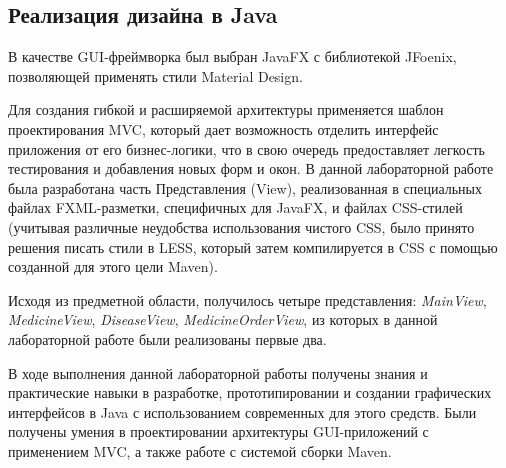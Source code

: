 \documentclass[a4paper,14pt]{extarticle}
\newcommand{\Code}[1]{\textit{#1}}
\begin{document}


\clearpage

\subsection{Реализация дизайна в Java}

В качестве GUI-фреймворка был выбран JavaFX с библиотекой JFoenix, позволяющей
применять стили Material Design.

Для создания гибкой и расширяемой архитектуры применяется шаблон проектирования
MVC, который дает возможность отделить интерфейс приложения от его
бизнес-логики, что в свою очередь предоставляет легкость тестирования и
добавления новых форм и окон. В данной лабораторной работе была разработана
часть Представления (View), реализованная в специальных файлах FXML-разметки,
специфичных для JavaFX, и файлах CSS-стилей (учитывая различные неудобства
использования чистого CSS, было принято решения писать стили в LESS, который
затем компилируется в CSS с помощью созданной для этого цели Maven).

Исходя из предметной области, получилось четыре представления: \Code{MainView},
\Code{MedicineView}, \Code{DiseaseView}, \Code{MedicineOrderView}, из которых
в данной лабораторной работе были реализованы первые два.



В ходе выполнения данной лабораторной работы получены знания и практические
навыки в разработке, прототипировании и создании графических интерфейсов в Java
с использованием современных для этого средств. Были получены умения в
проектировании архитектуры GUI-приложений с применением MVC, а также работе с
системой сборки Maven.
\end{document}
